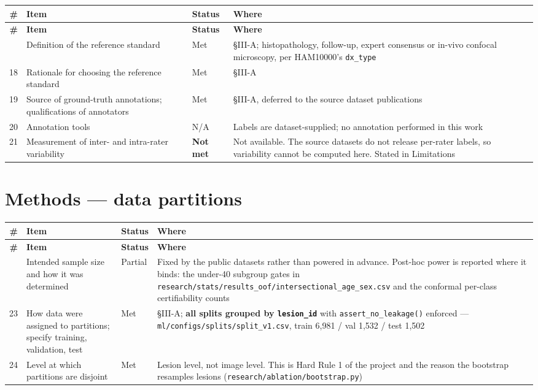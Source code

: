 \documentclass[10pt,a4paper]{article}
\begin{document}
\begin{longtable}{@{}rp{}lp{}@{}}
\toprule
\textbf{\#} & \textbf{Item} & \textbf{Status} & \textbf{Where} \\
\midrule
\endfirsthead
\toprule
\textbf{\#} & \textbf{Item} & \textbf{Status} & \textbf{Where} \\
\midrule
\endhead
\bottomrule
\endfoot
17 & Definition of the reference standard & Met & \S{}III-A; histopathology, follow-up, expert consensus or in-vivo confocal microscopy, per HAM10000's \texttt{dx\_type} \\
18 & Rationale for choosing the reference standard & Met & \S{}III-A \\
19 & Source of ground-truth annotations; qualifications of annotators & Met & \S{}III-A, deferred to the source dataset publications \\
20 & Annotation tools & N/A & Labels are dataset-supplied; no annotation performed in this work \\
21 & Measurement of inter- and intra-rater variability & \textbf{Not met} & Not available. The source datasets do not release per-rater labels, so variability cannot be computed here. Stated in Limitations \\
\end{longtable}


\section*{Methods --- data partitions}


\begin{longtable}{@{}rp{}lp{}@{}}
\toprule
\textbf{\#} & \textbf{Item} & \textbf{Status} & \textbf{Where} \\
\midrule
\endfirsthead
\toprule
\textbf{\#} & \textbf{Item} & \textbf{Status} & \textbf{Where} \\
\midrule
\endhead
\bottomrule
\endfoot
22 & Intended sample size and how it was determined & Partial & Fixed by the public datasets rather than powered in advance. Post-hoc power is reported where it binds: the under-40 subgroup gates in \texttt{research/stats/results\_oof/intersectional\_age\_sex.csv} and the conformal per-class certifiability counts \\
23 & How data were assigned to partitions; specify training, validation, test & Met & \S{}III-A; \textbf{all splits grouped by \texttt{lesion\_id}} with \texttt{assert\_no\_leakage()} enforced --- \texttt{ml/configs/splits/split\_v1.csv}, train 6,981 / val 1,532 / test 1,502 \\
24 & Level at which partitions are disjoint & Met & Lesion level, not image level. This is Hard Rule 1 of the project and the reason the bootstrap resamples lesions (\texttt{research/ablation/bootstrap.py}) \\
\end{longtable}
\end{document}
